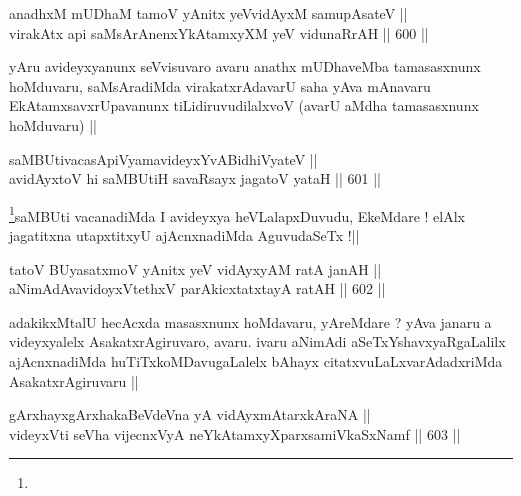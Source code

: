 \begin{shl}
anadhxM mUDhaM tamoV yAnitx yeV\s vidAyxM samupAsateV || \\
virakAtx api saMsArAnenxYkAtamxyXM yeV vidunaRrAH ||  600 ||  
\end{shl}

\begin{artha}
yAru avideyxyanunx seVvisuvaro avaru anathx mUDhaveMba tamasasxnunx
hoMduvaru, saMsAradiMda virakatxrAdavarU saha yAva mAnavaru
EkAtamxsavxrUpavanunx tiLidiruvudilalxvoV (avarU aMdha tamasasxnunx
hoMduvaru) ||
\end{artha}


\begin{shl}
saMBUtivacasA\s piVyamavideyxYvABidhiVyateV ||  \\
avidAyxtoV hi saMBUtiH savaRsayx jagatoV yataH ||  601 ||  
\end{shl}

\begin{artha}
\footnote{}saMBUti vacanadiMda I avideyxya heVLalapxDuvudu, EkeMdare !
elAlx jagatitxna utapxtitxyU ajAcnxnadiMda AguvudaSeTx !||
\end{artha}


\begin{shl}
tatoV BUyasatxmoV yAnitx yeV vidAyxyAM ratA janAH || \\
aNimAdAvavidoyxVtethxV parAkicxtatxtayA ratAH ||  602 ||  
\end{shl}

\begin{artha}
adakikxMtalU hecAcxda masasxnunx hoMdavaru, yAreMdare ? yAva janaru a
videyxyalelx AsakatxrAgiruvaro, avaru. ivaru aNimAdi
aSeTxYshavxyaRgaLalilx ajAcnxnadiMda huTiTxkoMDavugaLalelx bAhayx
citatxvuLaLxvarAdadxriMda AsakatxrAgiruvaru ||
\end{artha}


\begin{shl}
gArxhayxgArxhakaBeVdeVna yA vidAyxmAtarxkAraNA || \\
videyxVti seVha vijecnxVyA neYkAtamxyXparxsamiVkaSxNamf ||  603  ||  
\end{shl}

